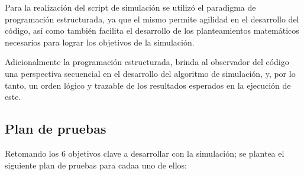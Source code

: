 \documentclass[11pt,a4paper,twocolumn]{article}
\begin{document}
   \begin{center}
    \end{center}

    Para la realización del script de simulación se utilizó el paradigma de programación estructurada, ya 
    que el mismo permite agilidad en el desarrollo del código, así como también facilita el desarrollo de los 
    planteamientos matemáticos necesarios para lograr los objetivos de la simulación.
    
    Adicionalmente la programación estructurada, brinda al observador del código una perspectiva secuencial en 
    el desarrollo del algoritmo de simulación, y, por lo tanto, un orden lógico y trazable de los resultados 
    esperados en la ejecución de este.
    
    \subsection{Plan de pruebas}
    Retomando los 6 objetivos clave a desarrollar con la simulación; se plantea el siguiente plan de pruebas 
    para cadaa uno de ellos:
\end{document}
